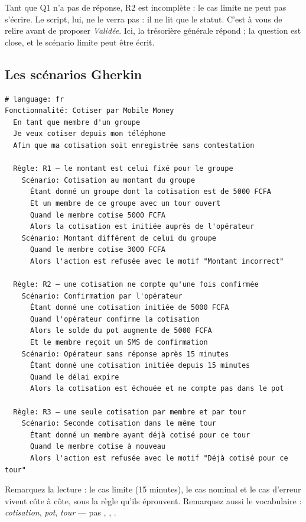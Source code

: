 \begin{piege}
Tant que Q1 n'a pas de réponse, R2 est incomplète : le cas limite  ne peut
pas s'écrire. Le script, lui, ne le verra pas : il ne lit que le statut. C'est à vous de relire avant
de proposer \emph{Validée}. Ici, la trésorière générale répond  ; la question est close, et
le scénario limite peut être écrit.
\end{piege}

\subsection*{Les scénarios Gherkin}
\begin{code}
\begin{Verbatim}
# language: fr
Fonctionnalité: Cotiser par Mobile Money
  En tant que membre d'un groupe
  Je veux cotiser depuis mon téléphone
  Afin que ma cotisation soit enregistrée sans contestation

  Règle: R1 — le montant est celui fixé pour le groupe
    Scénario: Cotisation au montant du groupe
      Étant donné un groupe dont la cotisation est de 5000 FCFA
      Et un membre de ce groupe avec un tour ouvert
      Quand le membre cotise 5000 FCFA
      Alors la cotisation est initiée auprès de l'opérateur
    Scénario: Montant différent de celui du groupe
      Quand le membre cotise 3000 FCFA
      Alors l'action est refusée avec le motif "Montant incorrect"

  Règle: R2 — une cotisation ne compte qu'une fois confirmée
    Scénario: Confirmation par l'opérateur
      Étant donné une cotisation initiée de 5000 FCFA
      Quand l'opérateur confirme la cotisation
      Alors le solde du pot augmente de 5000 FCFA
      Et le membre reçoit un SMS de confirmation
    Scénario: Opérateur sans réponse après 15 minutes
      Étant donné une cotisation initiée depuis 15 minutes
      Quand le délai expire
      Alors la cotisation est échouée et ne compte pas dans le pot

  Règle: R3 — une seule cotisation par membre et par tour
    Scénario: Seconde cotisation dans le même tour
      Étant donné un membre ayant déjà cotisé pour ce tour
      Quand le membre cotise à nouveau
      Alors l'action est refusée avec le motif "Déjà cotisé pour ce tour"
\end{Verbatim}
\end{code}
Remarquez la lecture : le cas limite (15 minutes), le cas nominal et le cas d'erreur vivent côte à côte, sous la règle qu'ils éprouvent.
Remarquez aussi le vocabulaire : \emph{cotisation}, \emph{pot}, \emph{tour} --- pas , , .

